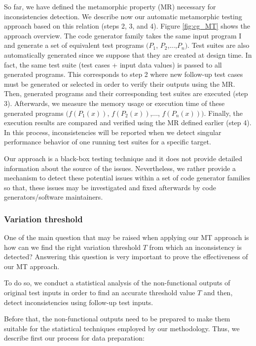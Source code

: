 So far, we have defined the metamorphic property (MR) necessary for inconsistencies detection. We describe now our automatic metamorphic testing approach based on this relation (steps 2, 3, and 4). 
Figure \ref{fig:cg_MT} shows the approach overview.
The code generator family takes the same input program I and generate a set of equivalent test programs $(P_{1}$, $P_{2}$,...,$P_{n})$. Test suites are also automatically generated since we suppose that they are created at design time. In fact, the same test suite (test cases + input data values) is passed to all generated programs. This corresponds to step 2 where new follow-up test cases must be generated or selected in order to verify their outputs using the MR. 
Then, generated programs and their corresponding test suites are executed (step 3). Afterwards, we measure the memory usage or execution time of these generated programs $(f(P_{1}(x))$, $f(P_{2}(x))$,..., $f(P_{n}(x)))$. Finally, the execution results are compared and verified using the MR defined earlier (step 4).
In this process, inconsistencies will be reported when we detect singular performance behavior of one running test suites for a specific target.

Our approach is a black-box testing technique and it does not provide detailed information about the source of the issues. Nevertheless, we rather provide a mechanism to detect these potential issues within a set of code generator families so that, these issues may be investigated and fixed afterwards by code generators/software maintainers. 



\subsubsection{Variation threshold}
One of the main question that may be raised when applying our MT approach is how can we find the right variation threshold $T$ from which an inconsistency is detected? Answering this question is very important to prove the effectiveness of our MT approach.

To do so, we conduct a statistical analysis of the non-functional outputs of original test inputs in order to find an accurate threshold value $T$ and then, detect inconsistencies using follow-up test inputs.
 
Before that, the non-functional outputs need to be prepared to make them suitable for the statistical techniques employed by our methodology. Thus, we describe first our process for data preparation:

